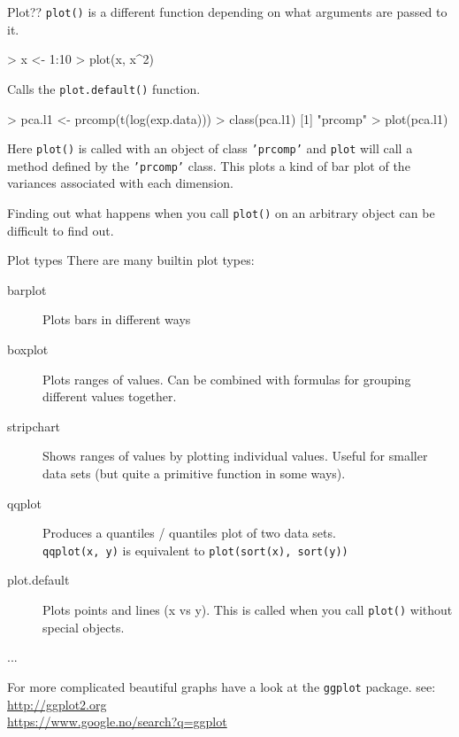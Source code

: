 \documentclass[pdf]{beamer}
\begin{document}
\begin{frame}[fragile]{Plot??}
  \texttt{plot()} is a different function depending on what arguments
  are passed to it.

  \begin{rcode}
    > x <- 1:10
    > plot(x, x^2)
  \end{rcode}
  \small Calls the \texttt{plot.default()} function.

  \begin{rcode}
    > pca.l1 <- prcomp(t(log(exp.data)))
    > class(pca.l1)
    [1] "prcomp"
    > plot(pca.l1)
  \end{rcode}

  {\small
  Here \texttt{plot()} is called with an object of class \texttt{'prcomp'}
  and \texttt{plot} will call a method defined by the \texttt{'prcomp'} class.
  This plots a kind of bar plot of the variances associated with
  each dimension.
  
  Finding out what happens when you call \texttt{plot()} on an arbitrary
  object can be difficult to find out.
}
\end{frame}

\begin{frame}[fragile]{Plot types}
  There are many builtin plot types:

  {\small
  \begin{description}
  \item[barplot] Plots bars in different ways
  \item[boxplot] Plots ranges of values. Can be combined with formulas for
    grouping different values together.
  \item[stripchart] Shows ranges of values by plotting individual values. Useful
    for smaller data sets (but quite a primitive function in some ways).
  \item[qqplot] Produces a quantiles / quantiles plot of two data sets.\\
    \texttt{qqplot(x, y)} is equivalent to \texttt{plot(sort(x), sort(y))}
  \item[plot.default] Plots points and lines (x vs y). This is called when
    you call \texttt{plot()} without special objects.
  \item[...]
  \end{description}
  
  For more complicated beautiful graphs have a look at the \texttt{ggplot}
  package. see:\\
  \url{http://ggplot2.org}\\
  \url{https://www.google.no/search?q=ggplot}
   }
\end{frame}
\end{document}
